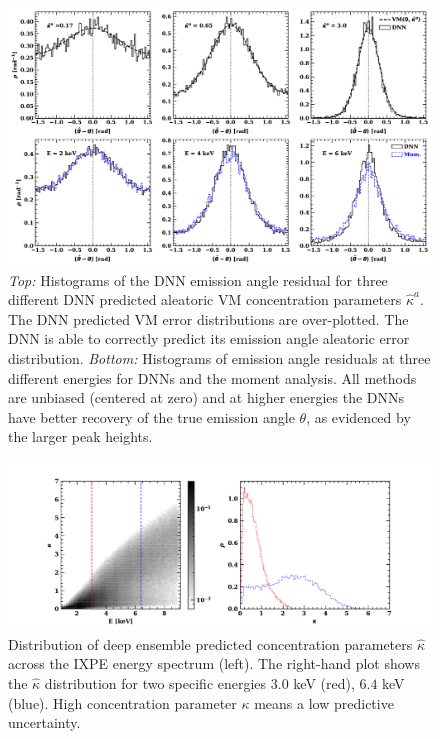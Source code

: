 \begin{figure}
\centering
\includegraphics[width=1.0\textwidth]{figures/kappa.pdf}
\caption{\textit{Top:} Histograms of the DNN emission angle residual for three different DNN predicted aleatoric VM concentration parameters $\hat{\kappa}^{a}$. The DNN predicted VM error distributions are over-plotted. The DNN is able to correctly predict its emission angle aleatoric error distribution. \textit{Bottom:} Histograms of emission angle residuals at three different energies for DNNs and the moment analysis. All methods are unbiased (centered at zero) and at higher energies the DNNs have better recovery of the true emission angle $\theta$, as evidenced by the larger peak heights.}
\label{fig:kappa}
\end{figure}

\begin{figure}
\centering
\includegraphics[width=1.05\textwidth]{figures/kappa_dist.pdf}
\caption{Distribution of deep ensemble predicted concentration parameters $\hat{\kappa}$ across the IXPE energy spectrum (left). The right-hand plot shows the $\hat{\kappa}$ distribution for two specific energies $3.0$ keV (red), $6.4$ keV (blue). High concentration parameter $\kappa$ means a low predictive uncertainty.}
\label{fig:kappadist}
\end{figure}

